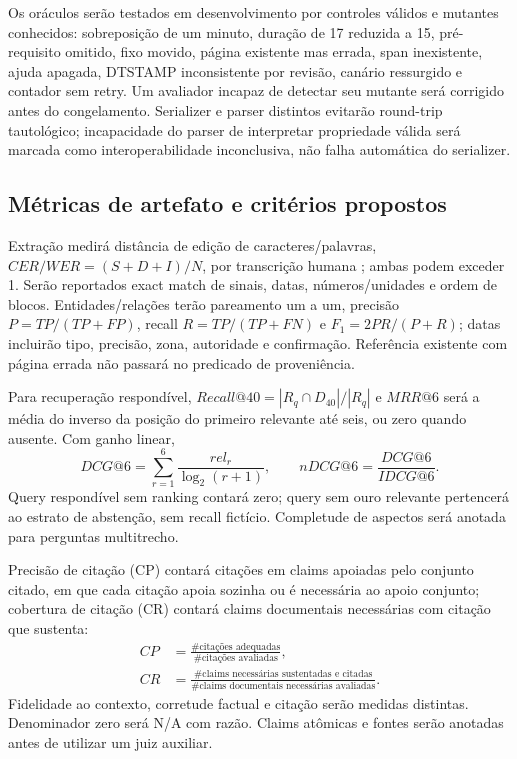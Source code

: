 \documentclass[12pt]{article}
\let\cite\citep
\begin{document}
Os oráculos serão testados em desenvolvimento por controles válidos e mutantes conhecidos: sobreposição de um minuto, duração de 17 reduzida a 15, pré-requisito omitido, fixo movido, página existente mas errada, span inexistente, ajuda apagada, DTSTAMP inconsistente por revisão, canário ressurgido e contador sem retry. Um avaliador incapaz de detectar seu mutante será corrigido antes do congelamento. Serializer e parser distintos evitarão round-trip tautológico; incapacidade do parser de interpretar propriedade válida será marcada como interoperabilidade inconclusiva, não falha automática do serializer.

\subsection{Métricas de artefato e critérios propostos}

Extração medirá distância de edição de caracteres/palavras, $CER/WER=(S+D+I)/N$, por transcrição humana \cite{jiwerQuality}; ambas podem exceder 1. Serão reportados exact match de sinais, datas, números/unidades e ordem de blocos. Entidades/relações terão pareamento um a um, precisão $P=TP/(TP+FP)$, recall $R=TP/(TP+FN)$ e $F_1=2PR/(P+R)$; datas incluirão tipo, precisão, zona, autoridade e confirmação. Referência existente com página errada não passará no predicado de proveniência.

Para recuperação respondível, $Recall@40=|R_q\cap D_{40}|/|R_q|$ e $MRR@6$ será a média do inverso da posição do primeiro relevante até seis, ou zero quando ausente. Com ganho linear,
\begin{equation}
 DCG@6=\sum_{r=1}^{6}\frac{rel_r}{\log_2(r+1)},
 \qquad nDCG@6=\frac{DCG@6}{IDCG@6}.
\end{equation}
Query respondível sem ranking contará zero; query sem ouro relevante pertencerá ao estrato de abstenção, sem recall fictício. Completude de aspectos será anotada para perguntas multitrecho.

Precisão de citação (CP) contará citações em claims apoiadas pelo conjunto citado, em que cada citação apoia sozinha ou é necessária ao apoio conjunto; cobertura de citação (CR) contará claims documentais necessárias com citação que sustenta:
\begin{align}
 CP&=\frac{\#\text{citações adequadas}}{\#\text{citações avaliadas}},\\
 CR&=\frac{\#\text{claims necessárias sustentadas e citadas}}{\#\text{claims documentais necessárias avaliadas}}.
\end{align}
Fidelidade ao contexto, corretude factual e citação serão medidas distintas. Denominador zero será N/A com razão. Claims atômicas e fontes serão anotadas antes de utilizar um juiz auxiliar.
\end{document}
